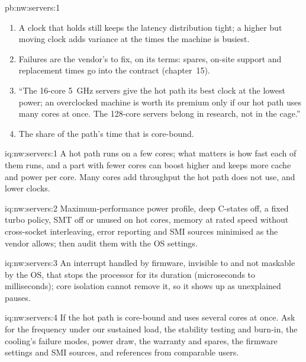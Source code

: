 \begin{solution}{pb:nw:servers:1}
\begin{enumerate}
\item A clock that holds still keeps the latency distribution tight; a higher but moving clock adds variance at the times the machine is
  busiest.
\item Failures are the vendor's to fix, on its terms: spares, on-site support and replacement times go into the contract (chapter~15).
\item ``The 16-core 5~GHz servers give the hot path its best clock at the lowest power; an overclocked machine is worth its premium only if our
  hot path uses many cores at once. The 128-core servers belong in research, not in the cage.''
\item The share of the path's time that is core-bound.
\end{enumerate}
\end{solution}

\begin{solution}{iq:nw:servers:1}
A hot path runs on a few cores; what matters is how fast each of them runs, and a part with fewer cores can boost higher and keeps more cache
and power per core. Many cores add throughput the hot path does not use, and lower clocks.
\end{solution}

\begin{solution}{iq:nw:servers:2}
Maximum-performance power profile, deep C-states off, a fixed turbo policy, SMT off or unused on hot cores, memory at rated speed without
cross-socket interleaving, error reporting and SMI sources minimised as the vendor allows; then audit them with the OS settings.
\end{solution}

\begin{solution}{iq:nw:servers:3}
An interrupt handled by firmware, invisible to and not maskable by the OS, that stops the processor for its duration (microseconds to
milliseconds); core isolation cannot remove it, so it shows up as unexplained pauses.
\end{solution}

\begin{solution}{iq:nw:servers:4}
If the hot path is core-bound and uses several cores at once. Ask for the frequency under our sustained load, the stability testing and burn-in,
the cooling's failure modes, power draw, the warranty and spares, the firmware settings and SMI sources, and references from comparable users.
\end{solution}

